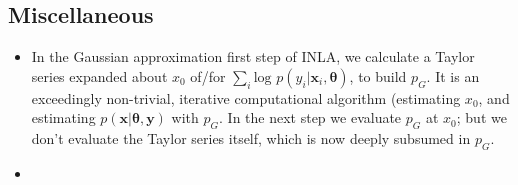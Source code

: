 \documentclass{article}
\begin{document}
\subsection*{Miscellaneous}
\begin{itemize}
\item In the Gaussian approximation first step of INLA, we calculate a Taylor series expanded about $x_{0}$ of/for $\sum_{i} \text{log }p(y_{i}|\pmb{x}_{i},\pmb{\theta})$, to build $p_{G}$. It is an exceedingly non-trivial, iterative computational algorithm (estimating $x_{0}$, and estimating $p(\pmb{x}|\pmb{\theta}, \pmb{y})$ with $p_{G}$. In the next step we evaluate $p_{G}$ at $x_{0}$; but we don't evaluate the Taylor series itself, which is now deeply subsumed in $p_{G}$. 
\item 
\end{itemize}
\end{document}
